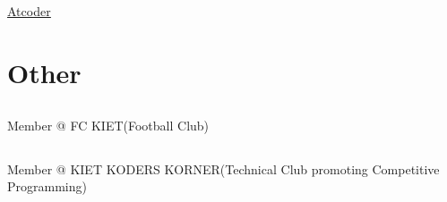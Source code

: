 \documentclass[a4paper,11pt]{article}
\begin{document}
\subsection{}\hspace{0.5em}
\underline{\href{https://atcoder.jp/users/aksnaresh}{Atcoder}}

\vspace{-1.1em}

\section{Other}

\subsection{}\hspace{0.5em}Member @ FC KIET(Football Club)
\subsection{}\hspace{0.5em}Member @ KIET KODERS KORNER(Technical Club promoting Competitive Programming) 
\end{document}
